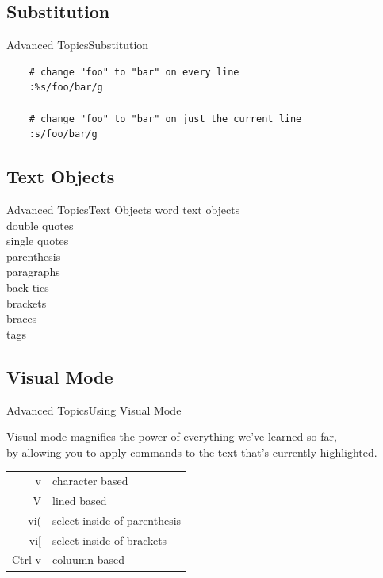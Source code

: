 \documentclass{beamer}
\begin{document}
\subsection{Substitution}
\begin{frame}[fragile]{Advanced Topics}{Substitution}
    \begin{lstlisting}
    # change "foo" to "bar" on every line
    :%s/foo/bar/g

    # change "foo" to "bar" on just the current line
    :s/foo/bar/g
    \end{lstlisting}
\end{frame}


\subsection{Text Objects}
\begin{frame}[t]{Advanced Topics}{Text Objects}
    \centering
    word text objects \\
    double quotes \\
    single quotes \\
    parenthesis \\
    paragraphs \\
    back tics \\
    brackets \\
    braces \\
    tags \\
    
\end{frame}



\subsection{Visual Mode}
\begin{frame}[t]{Advanced Topics}{Using Visual Mode}

    Visual mode magnifies the power of everything we've learned so far, \\
    by allowing you to apply commands to the text that's currently highlighted.

    \begin{table}[htpb]
        \centering
        \begin{tabular}{r|l}
            v      & character based \\
            V      & lined based \\
            vi(    & select inside of parenthesis \\
            vi[    & select inside of brackets \\
            Ctrl-v & coluumn based \\
        \end{tabular}
    \end{table}
    
\end{frame}
\end{document}
